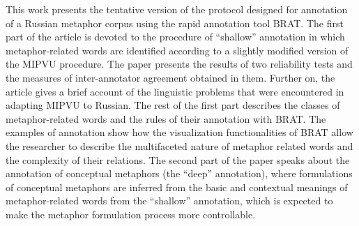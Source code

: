 This work presents the tentative version of the protocol designed for annotation of a Russian metaphor corpus using the rapid annotation tool BRAT.
 The first part of the article is devoted to the procedure of ``shallow''
 annotation in which metaphor-related words are identified according to a
 slightly modified version of the MIPVU procedure. The paper presents the
 results of two reliability tests and the measures of inter-annotator agreement
 obtained in them. Further on, the article gives a brief account of the
 linguistic problems that were encountered in adapting MIPVU to Russian. The
 rest of the first part describes the classes of metaphor-related words and the
 rules of their annotation with BRAT. The examples of annotation show how the
 visualization functionalities of BRAT allow the researcher to describe the
 multifaceted nature of metaphor related words and the complexity of their
 relations.
 The second part of the paper speaks about the annotation of conceptual
 metaphors (the ``deep'' annotation), where formulations of conceptual metaphors
 are inferred from the basic and contextual meanings of metaphor-related words
 from the ``shallow'' annotation, which is expected to make the metaphor
 formulation process more controllable.


